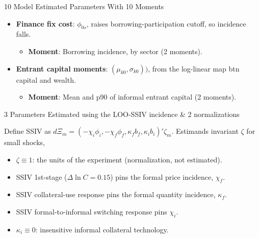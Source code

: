 \documentclass[11pt,aspectratio=169]{beamer}
\providecommand{\infml}{i}
\providecommand{\fml}{f}
\providecommand{\spread}[1]{\phi_{#1}}
\providecommand{\collat}[1]{b_{#1}}
\begin{document}
\begin{frame}{10 Model Estimated Parameters With 10 Moments}
\begin{itemize}
    \item \textbf{Finance fix cost}: $\phi_{0s}$, raises borrowing-participation cutoff, so incidence falls.
    \begin{itemize}
        \item \textbf{Moment}: Borrowing incidence, by sector (2 moments).
    \end{itemize}
    \vspace{1mm}
    \item \textbf{Entrant capital moments}: $(\mu_{k0},\sigma_{k0}))$, from the log-linear map btn capital and wealth.
    \begin{itemize}
        \item \textbf{Moment}: Mean and p90 of informal entrant capital (2 moments).
    \end{itemize}
\end{itemize}

\end{frame}


\begin{frame}{3 Parameters Estimated using the LOO-SSIV incidence \& 2 normalizations}

Define SSIV as $d\Xi_{m}=(- \chi_{\infml}\spread{\infml},  -\chi_{\fml}\spread{\fml},\kappa_{\fml}\collat{\fml},\kappa_{\infml}\collat{\infml})'\zeta_{m}$. Estimands invariant $\zeta$ for small shocks,

\vspace{5mm}

\begin{itemize}
    \item $\zeta \equiv 1$: the units of the experiment (normalization, not estimated).
    \vspace{2mm}
    \item SSIV 1st-stage ($\Delta\ln C = 0.15$) pins the formal price incidence, $\chi_{\fml}$.
    \vspace{2mm}
    \item SSIV collateral-use response pins the formal quantity incidence, $\kappa_{\fml}$.
    \vspace{2mm}
    \item SSIV formal-to-informal switching response pins $\chi_{\infml}$.
    \vspace{2mm}
    \item $\kappa_{\infml} \equiv 0$: insensitive informal collateral technology.
\end{itemize}

\end{frame}
\end{document}
